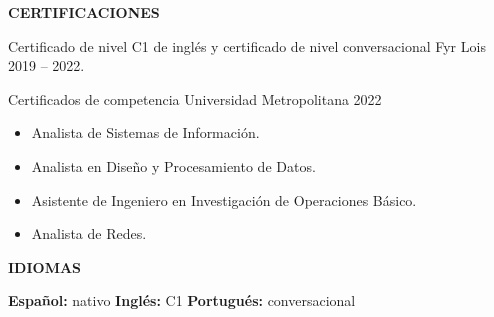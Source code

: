 \documentclass[10pt,a4paper]{article}
\newcommand{\cvsection}[1]{%
    \vspace{11pt}%
    {\large\bfseries\color{navy}#1}\par
    \vspace{2pt}{\color{accent}\rule{\linewidth}{1.2pt}}\par
    \vspace{5pt}%
}
\begin{document}
\cvsection{CERTIFICACIONES}
Certificado de nivel C1 de inglés y certificado de nivel conversacional \textbar{} Fyr Lois \textbar{} 2019 -- 2022.

\vspace{4pt}
Certificados de competencia \textbar{} Universidad Metropolitana \textbar{} 2022
\begin{itemize}
    \item Analista de Sistemas de Información.
    \item Analista en Diseño y Procesamiento de Datos.
    \item Asistente de Ingeniero en Investigación de Operaciones Básico.
    \item Analista de Redes.
\end{itemize}

\cvsection{IDIOMAS}
\textbf{Español:} nativo \hfill
\textbf{Inglés:} C1 \hfill
\textbf{Portugués:} conversacional
\end{document}

